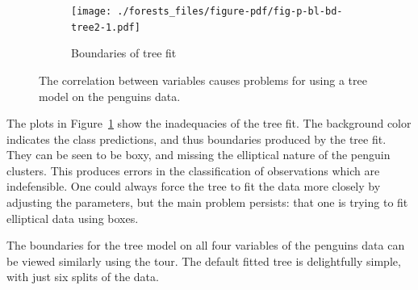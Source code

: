 \documentclass[
  letterpaper,
]{book}
\begin{document}
\begin{figure}
\begin{minipage}[t]{0.50\linewidth}
{\begin{figure}[H]

{\centering \texttt{[image: ./forests\_files/figure-pdf/fig-p-bl-bd-tree2-1.pdf]}

}

\caption{Boundaries of tree fit}

\end{figure}

}

\end{minipage}%

\caption{\label{fig-p-bl-bd-tree}The correlation between variables
causes problems for using a tree model on the penguins data.}

\end{figure}

The plots in Figure~\ref{fig-p-bl-bd-tree} show the inadequacies of the
tree fit. The background color indicates the class predictions, and thus
boundaries produced by the tree fit. They can be seen to be boxy, and
missing the elliptical nature of the penguin clusters. This produces
errors in the classification of observations which are indefensible. One
could always force the tree to fit the data more closely by adjusting
the parameters, but the main problem persists: that one is trying to fit
elliptical data using boxes.

The boundaries for the tree model on all four variables of the penguins
data can be viewed similarly using the tour. The default fitted tree is
delightfully simple, with just six splits of the data.
\end{document}
